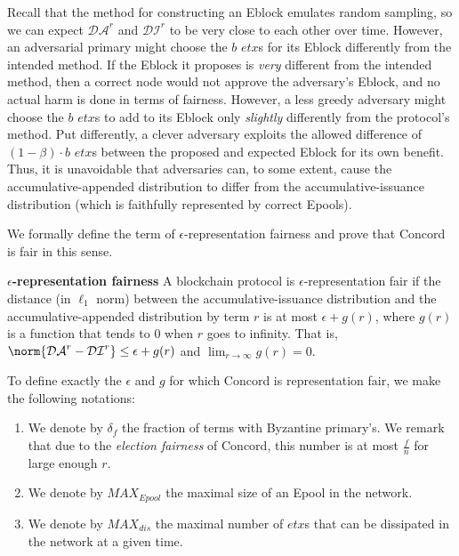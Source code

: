 
Recall that the method for constructing an Eblock emulates random sampling, so we can expect $\mathcal{DA}^r$ and $\mathcal{DI}^r$ to be very close to each other over time. However, an adversarial primary might choose the $b$ $etx$s for its Eblock differently from the intended method. If the Eblock it proposes is \emph{very} different from the intended method, then a correct node would not approve the adversary's Eblock, and no actual harm is done in terms of fairness. However, a less greedy adversary might choose the $b$ $etx$s to add to its Eblock only \emph{slightly} differently from the protocol's method. Put differently, a clever adversary exploits the allowed difference of $(1-\beta)\cdot b$ $etx$s between the proposed and expected Eblock for its own benefit. Thus, it is unavoidable that adversaries can, to some extent, cause the accumulative-appended distribution to differ from the accumulative-issuance distribution (which is faithfully represented by correct Epools). 

We formally define the term of $\epsilon$-representation fairness and prove that Concord is fair in this sense. 

\begin{definition}{\textbf{$\epsilon$-representation fairness}} A blockchain protocol is $\epsilon$-representation fair if the distance (in $\ell _1$ norm) between the accumulative-issuance distribution and the accumulative-appended distribution by term $r$ is at most $\epsilon+g(r)$, where $g(r)$ is a function that tends to $0$ when $r$ goes to infinity. That is,  $\norm{\mathcal{DA}^r-\mathcal{DI}^{r}}\leq \epsilon+g(r)$ and $\lim _{r\rightarrow \infty}g(r)=0$.
\end{definition}
 
To define exactly the $\epsilon$ and $g$ for which Concord is representation fair, we make the following notations: 
\begin{enumerate}
    \item We denote by $\delta_f$ the fraction of terms with Byzantine primary's. We remark that due to the \textit{election fairness} of Concord, this number is at most $\frac{f}{n}$ for large enough $r$.
    \item We denote by $MAX_{Epool}$ the maximal size of an Epool in the network. 
    \item We denote by $MAX_{dis}$ the maximal number of $etx$s that can be dissipated in the network at a given time. 
\end{enumerate}


